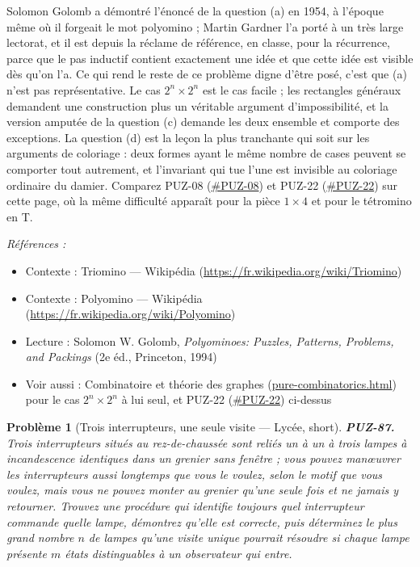 \documentclass[11pt]{article}
\newtheorem{problem}{Problème}
\newenvironment{refs}{\par\small\noindent\emph{Références :}\begin{itemize}\setlength\itemsep{0pt}}{\end{itemize}\normalsize}
\begin{document}
\noindent Solomon Golomb a démontré l'énoncé de la question (a) en 1954, à l'époque
même où il forgeait le mot \og{} polyomino \fg{} ; Martin Gardner l'a porté à un très large lectorat,
et il est depuis la réclame de référence, en classe, pour la récurrence, parce que le pas
inductif contient exactement une idée et que cette idée est visible dès qu'on l'a. Ce qui
rend le reste de ce problème digne d'être posé, c'est que (a) n'est pas représentative. Le
cas $ 2^{n} \times 2^{n} $ est le cas facile ; les rectangles généraux demandent une
construction plus un véritable argument d'impossibilité, et la version amputée de la
question (c) demande les deux ensemble et comporte des exceptions. La question (d) est la
leçon la plus tranchante qui soit sur les arguments de coloriage : deux formes ayant le même
nombre de cases peuvent se comporter tout autrement, et l'invariant qui tue l'une est
invisible au coloriage ordinaire du damier. Comparez PUZ-08 (\url{#PUZ-08}) et
PUZ-22 (\url{#PUZ-22}) sur cette page, où la même difficulté apparaît pour la pièce
$ 1 \times 4 $ et pour le tétromino en T.

\begin{refs}
\item Contexte : Triomino --- Wikipédia (\url{https://fr.wikipedia.org/wiki/Triomino})
\item Contexte : Polyomino --- Wikipédia (\url{https://fr.wikipedia.org/wiki/Polyomino})
\item Lecture : Solomon W. Golomb, \textit{Polyominoes: Puzzles, Patterns, Problems, and Packings} (2e éd., Princeton, 1994)
\item Voir aussi : Combinatoire et théorie des graphes (\url{pure-combinatorics.html}) pour le cas $ 2^{n} \times 2^{n} $ à lui seul, et PUZ-22 (\url{#PUZ-22}) ci-dessus
\end{refs}

\bigskip

\begin{problem}[{Trois interrupteurs, une seule visite --- Lycée, short}]
\textbf{PUZ-87.} Trois interrupteurs situés au rez-de-chaussée sont
reliés un à un à trois lampes à incandescence identiques dans un grenier sans fenêtre ; vous
pouvez man\oe{}uvrer les interrupteurs aussi longtemps que vous le voulez, selon le motif que
vous voulez, mais vous ne pouvez monter au grenier qu'une seule fois et ne jamais y
retourner. Trouvez une procédure qui identifie toujours quel interrupteur commande quelle
lampe, démontrez qu'elle est correcte, puis déterminez le plus grand nombre $ n $ de
lampes qu'une visite unique pourrait résoudre si chaque lampe présente $ m $ états
distinguables à un observateur qui entre.
\end{problem}
\end{document}
